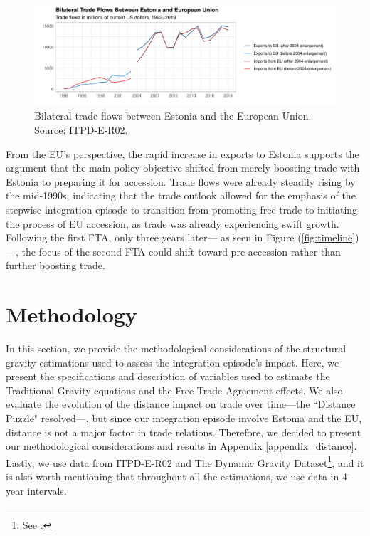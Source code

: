 \documentclass[a4paper,10pt]{article}
\begin{document}
\begin{figure}[!ht]
	\centering
	\includegraphics[width=0.9\linewidth]{Bilateral_flows.pdf}
	\caption{Bilateral trade flows between Estonia and the European Union. Source: ITPD-E-R02.}
	\label{fig:7}
\end{figure}

From the EU's perspective, the rapid increase in exports to Estonia supports the argument that the main policy objective shifted from merely boosting trade with Estonia to preparing it for accession. Trade flows were already steadily rising by the mid-1990s, indicating that the trade outlook allowed for the emphasis of the stepwise integration episode to transition from promoting free trade to initiating the process of EU accession, as trade was already experiencing swift growth. Following the first FTA, only three years later--- as seen in Figure (\ref{fig:timeline})---, the focus of the second FTA could shift toward pre-accession rather than further boosting trade.

\section{Methodology} \label{methodology}

In this section, we provide the methodological considerations of the structural gravity estimations used to assess the integration episode's impact. Here, we present the specifications and description of variables used to estimate the Traditional Gravity equations and the Free Trade Agreement effects. We also evaluate the evolution of the distance impact on trade over time---the ``Distance Puzzle" resolved---, but since our integration episode involve Estonia and the EU, distance is not a major factor in trade relations. Therefore, we decided to present our methodological considerations and results in Appendix \ref{appendix_distance}. Lastly, we use data from ITPD-E-R02 and The Dynamic Gravity Dataset\footnote{See \cite{gurevich_dynamic_2018}.}, and it is also worth mentioning that throughout all the estimations, we use data in 4-year intervals.
\end{document}
